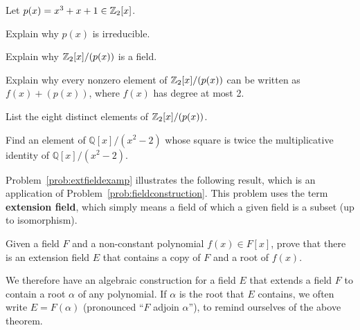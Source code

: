 \begin{problem}\label{prob:finitefields}
Let $p(x) = x^3 + x + 1 \in \mathbb{Z}_2[x]$.
\begin{problemparts}
\item Explain why $p(x)$ is irreducible.
\item Explain why \(\mathbb{Z}_2[x]/(p(x))\) is a field.
\item Explain why every nonzero element of \(\mathbb{Z}_2[x]/(p(x))\) can be written as $f(x) + (p(x))$, where $f(x)$ has degree at most 2.
\item List the eight distinct elements of \(\mathbb{Z}_2[x]/(p(x))\).
\begin{annotation}
\end{annotation}
\end{problemparts}
\end{problem}

\begin{problem}\label{prob:extfieldexamp}
Find an element of \(\mathbb{Q}[x]/(x^2-2)\) whose square is twice the multiplicative identity of \(\mathbb{Q}[x]/(x^2-2)\).
\end{problem}

Problem~\ref{prob:extfieldexamp} illustrates the following result, which is an application of Problem~\ref{prob:fieldconstruction}. This problem uses the term \textbf{extension field}, which simply means a field of which a given field is a subset (up to isomorphism).

\begin{problem}
Given a field \(F\) and a non-constant polynomial \(f(x) \in F[x]\), prove that there is an extension field \(E\) that contains a copy of \(F\) and a root of \(f(x)\).
\end{problem}

We therefore have an algebraic construction for a field \(E\) that extends a field \(F\) to contain a root \(\alpha\) of any polynomial. If \(\alpha\) is the root that \(E\) contains, we often write \(E = F(\alpha)\) (pronounced ``\(F\) adjoin \(\alpha\)''), to remind ourselves of the above theorem.
\begin{annotation}
\end{annotation}

